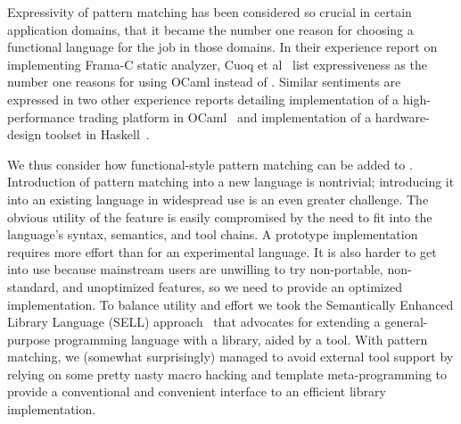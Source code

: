 Expressivity of pattern matching has been considered so crucial in certain application domains, 
that it became the number one reason for choosing a functional language for the 
job in those domains. In their experience report on implementing Frama-C static 
analyzer, Cuoq et al~\cite{FramaC09} list expressiveness as the number one reasons for using 
OCaml instead of \Cpp{}. Similar sentiments are expressed in 
two other experience reports detailing implementation of a high-performance 
trading platform in OCaml~\cite{Minsky08} and implementation of a hardware-design 
toolset in Haskell~\cite{Nanavati08}.

We thus consider how functional-style pattern matching can be added to \Cpp{}.
Introduction of pattern matching into a new language is nontrivial;
introducing it into an existing language in widespread use is an even greater 
challenge. The obvious utility of the feature is easily compromised by the need 
to fit into the language's syntax, semantics, and tool chains. A prototype 
implementation requires more effort than for an experimental language.
It is also
harder to get into use because mainstream users are unwilling to try 
non-portable, non-standard, and unoptimized features, so we need to provide an optimized implementation. 
To balance utility and effort we took the Semantically Enhanced Library Language 
(SELL) approach~\cite{SELL,BSGDR05} that advocates for extending a general-purpose 
programming language with a library, aided by a tool. With pattern matching, we 
(somewhat surprisingly) managed to avoid external tool support by relying on 
some pretty nasty macro hacking and template meta-programming to provide a 
conventional and convenient interface to an efficient library implementation.


